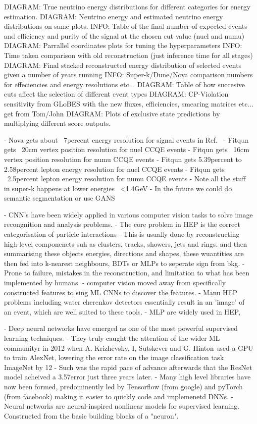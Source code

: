 DIAGRAM: True neutrino energy distributions for different categories for energy estimation.
DIAGRAM: Neutrino energy and estimated neutrino energy distributions on same plots.
INFO: Table of the final number of expected events and efficiency and purity of the signal at the chosen cut value (nuel and numu)
DIAGRAM: Parrallel coordinates plots for tuning the hyperparameters
INFO: Time taken comparison with old reconstruction (just inference time for all stages)
DIAGRAM: Final stacked reconstructed energy distribution of selected events given a number of years running
INFO: Super-k/Dune/Nova comparison numbers for effeciencies and energy resolutions etc...
DIAGRAM: Table of how succesive cuts affect the selection of different event types
DIAGRAM: CP-Violation sensitivity from GLoBES with the new fluxes, efficiencies, smearing matrices etc... get from Tom/John
DIAGRAM: Plots of exclusive state predictions by multiplying different score outputs.

- Nova gets about ~7percent energy resolution for signal events
in Ref.~\cite{jiang2019}
- Fitqun gets ~20cm vertex position resolution for nuel CCQE events
- Fitqun gets ~16cm vertex position resolution for numu CCQE events
- Fitqun gets 5.39percent to 2.58percent lepton energy resolution for nuel CCQE events
- Fitqun gets ~2.5percent lepton energy resolution for numu CCQE events
- Note all the stuff in super-k happens at lower energies ~<1.4GeV
- In the future we could do semantic segmentation or use GANS

- CNN's have been widely applied in various computer vision tasks to solve image recongnition and analysis problems.
- The core problem in HEP is the correct categorisation of particle interactions
- This is usually done by reconstructing high-level componenets suh as clusters, tracks, showers, jets and rings. and
then summarising these objects energies, directions and shapes, these wuantities are then fed into k-nearest neighbours,
BDTs or MLPs to seperate sign from bkg.
- Prone to failure, mistakes in the reconstruction, and limitation to what has been implemented by humans.
- computer vision moved away from specifically constructed features to sing ML CNNs to discover the features.
- Manu HEP problems including water cherenkov detectors essentially result in an 'image' of an event, which are well suited to these tools.
- MLP are widely used in HEP,

- Deep neural networks have emerged as one of the most powerful supervised learning techniques.
- They truly caught the attention of the wider ML communityr in 2012 when A. Krizhevsky, I, Sutskever and G. Hinton used a GPU to train
AlexNet, lowering the error rate on the image classification task ImageNet by 12%
- Such was the rapid pace of advance afterwards that the ResNet model acheived a 3.57\percent error just three years later.
- Many high level libraries have now been formed, predominently led by Tensorflow (from google) and pyTorch (from facebook) making it easier to quickly code and implemenetd DNNs.
- Neural networks are neural-inspired nonlinear models for supervised learning. Constructed from the basic building blocks of a "neuron".